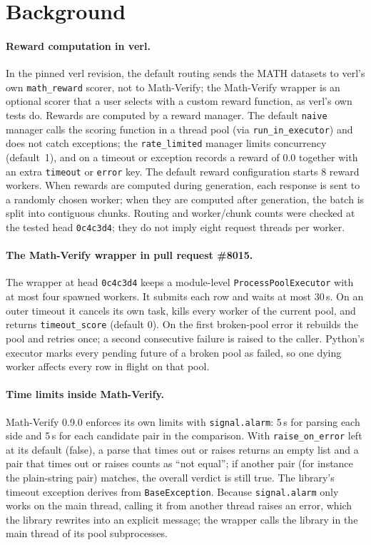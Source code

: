 \documentclass[10pt,a4paper]{article}
\newcommand{\mv}{Math-Verify}
\begin{document}
\section{Background}
\label{sec:background}

\paragraph{Reward computation in verl.}
In the pinned verl revision, the default routing sends the MATH datasets to
verl's own \texttt{math\_reward} scorer, not to \mv{}; the \mv{} wrapper is
an optional scorer that a user selects with a custom reward function, as
verl's own tests do. Rewards
are computed by a reward manager. The default \texttt{naive} manager calls
the scoring function in a thread pool (via \texttt{run\_in\_executor}) and does
not catch exceptions; the \texttt{rate\_limited} manager limits concurrency
(default~1), and on a timeout or exception records a reward of $0.0$ together
with an extra \texttt{timeout} or \texttt{error} key. The default reward
configuration starts 8 reward workers. When rewards are computed during
generation, each response is sent to a randomly chosen worker; when they are
computed after generation, the batch is split into contiguous chunks.
Routing and worker/chunk counts were checked at the tested head
\texttt{0c4c3d4}; they do not imply eight request threads per worker.

\paragraph{The \mv{} wrapper in pull request \#8015.}
The wrapper at head \texttt{0c4c3d4} keeps a module-level
\texttt{ProcessPoolExecutor} with at most four spawned workers. It submits
each row and waits at most 30\,s. On an outer timeout it cancels its own
task, kills every worker of the current pool, and returns
\texttt{timeout\_score} (default $0$). On the first broken-pool error it
rebuilds the pool and retries once; a second consecutive failure is raised
to the caller. Python's executor marks every pending future of a broken pool
as failed, so one dying worker affects every row in flight on that pool.

\paragraph{Time limits inside \mv{}.}
\mv{} 0.9.0 enforces its own limits with \texttt{signal.alarm}: 5\,s for
parsing each side and 5\,s for each candidate pair in the comparison. With
\texttt{raise\_on\_error} left at its default (false), a parse that times out or raises
returns an empty list and a pair that times out or raises counts as
``not equal''; if another pair (for instance the plain-string pair) matches,
the overall verdict is still true. The library's timeout exception derives
from \texttt{BaseException}. Because \texttt{signal.alarm} only works on
the main thread, calling it from another thread raises an error, which the
library rewrites into an explicit message; the wrapper calls the library in
the main thread of its pool subprocesses.
\end{document}
